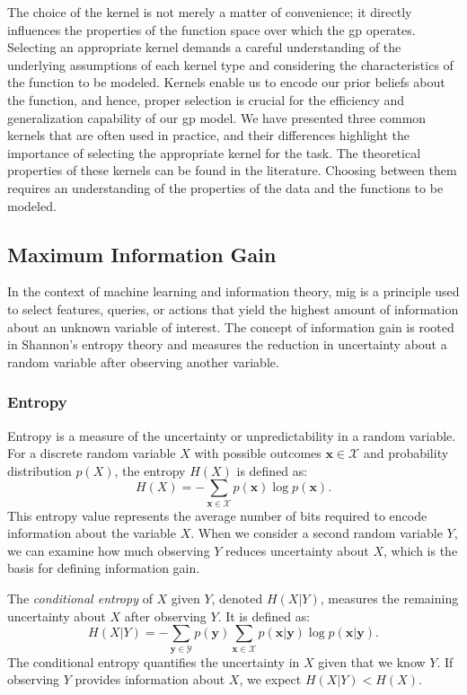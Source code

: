 The choice of the kernel is not merely a matter of convenience; it directly influences the properties of the function space over which the \ac{gp} operates. Selecting an appropriate kernel demands a careful understanding of the underlying assumptions of each kernel type and considering the characteristics of the function to be modeled. Kernels enable us to encode our prior beliefs about the function, and hence, proper selection is crucial for the efficiency and generalization capability of our \ac{gp} model. We have presented three common kernels that are often used in practice, and their differences highlight the importance of selecting the appropriate kernel for the task. The theoretical properties of these kernels can be found in the literature. Choosing between them requires an understanding of the properties of the data and the functions to be modeled.
\subsection{Maximum Information Gain}
\label{section:MIG}
In the context of machine learning and information theory, \ac{mig} is a principle used to select features, queries, or actions that yield the highest amount of information about an unknown variable of interest. The concept of information gain is rooted in Shannon’s entropy theory and measures the reduction in uncertainty about a random variable after observing another variable. 

\subsubsection{Entropy}
\label{section:entropy}
Entropy is a measure of the uncertainty or unpredictability in a random variable. For a discrete random variable $X$ with possible outcomes $\mathbf{x} \in \mathcal{X}$ and probability distribution $p(X)$, the entropy $H(X)$ is defined as:
\[
H(X) = - \sum_{\mathbf{x} \in \mathcal{X}} p(\mathbf{x}) \log p(\mathbf{x}).
\]
This entropy value represents the average number of bits required to encode information about the variable $X$. When we consider a second random variable $Y$, we can examine how much observing $Y$ reduces uncertainty about $X$, which is the basis for defining information gain.

The \textit{conditional entropy} of $X$ given $Y$, denoted $H(X \vert Y)$, measures the remaining uncertainty about $X$ after observing $Y$. It is defined as:
\[
H(X \vert Y) = - \sum_{\mathbf{y} \in \mathcal{Y}} p(\mathbf{y}) \sum_{\mathbf{x} \in \mathcal{X}} p(\mathbf{x} \vert \mathbf{y}) \log p(\mathbf{x} \vert \mathbf{y}).
\]
The conditional entropy quantifies the uncertainty in $X$ given that we know $Y$. If observing $Y$ provides information about $X$, we expect $H(X \vert Y) < H(X)$.

